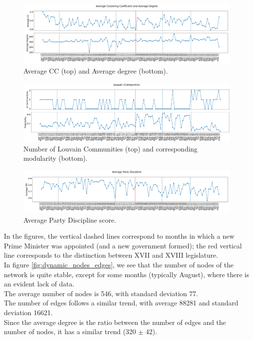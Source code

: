 \begin{figure}[h]
  \centering
  \includegraphics[width=\linewidth]{img/dynamic_avg_cc_deg_tot.png}
  \caption{Average CC (top) and Average degree (bottom).}
  \label{fig:cc_deg}
\end{figure}

\begin{figure}[h]
  \centering
  \includegraphics[width=\linewidth]{img/dynamic_louvain_tot.png}
  \caption{Number of Louvain Communities (top) and corresponding modularity (bottom).}
  \label{fig:dynamic_louvain}
\end{figure}



\begin{figure}[h]
  \centering
  \includegraphics[width=\linewidth]{img/dynamic_apd_tot.png}
  \caption{Average Party Discipline score.}
  \label{fig:dynamic_apd}
\end{figure}

In the figures, the vertical dashed lines correspond to months in which a new Prime Minister was appointed (and a new government formed); the red vertical line corresponds to the distinction between XVII and XVIII legislature.\\

In figure \ref{fig:dynamic_nodes_edges}, we see that the number of nodes of the network is quite stable, except for some months (typically August), where there is an evident lack of data.\\
The average number of nodes is 546, with standard deviation 77.\\
The number of edges follows a similar trend, with average 88281 and standard deviation 16621.\\
Since the average degree is the ratio between the number of edges and the number of nodes, it has a similar trend (320 $\pm$ 42).\\

